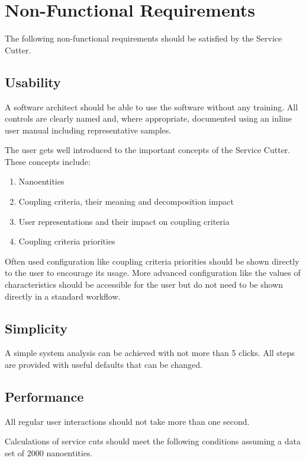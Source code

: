 \section{Non-Functional Requirements}
\label{sec:nonfunctionalRequirements}

The following non-functional requirements should be satisfied by the Service Cutter.

\subsection{Usability}
\label{sec:usability}

A software architect should be able to use the software without any training. All controls are clearly named and, where appropriate, documented using an inline user manual including representative samples.

The user gets well introduced to the important concepts of the Service Cutter. These concepts include:

\begin{enumerate}
	\item Nanoentities
	\item Coupling criteria, their meaning and decomposition impact
	\item User representations and their impact on coupling criteria
	\item Coupling criteria priorities 
\end{enumerate}

Often used configuration like coupling criteria priorities should be shown directly to the user to encourage its usage. More advanced configuration like the values of characteristics should be accessible for the user but do not need to be shown directly in a standard workflow. 

\subsection{Simplicity}

A simple system analysis can be achieved with not more than 5 clicks. All steps are provided with useful defaults that can be changed.

\subsection{Performance}

All regular user interactions should not take more than one second.

Calculations of service cuts should meet the following conditions assuming a data set of 2000 nanoentities.

